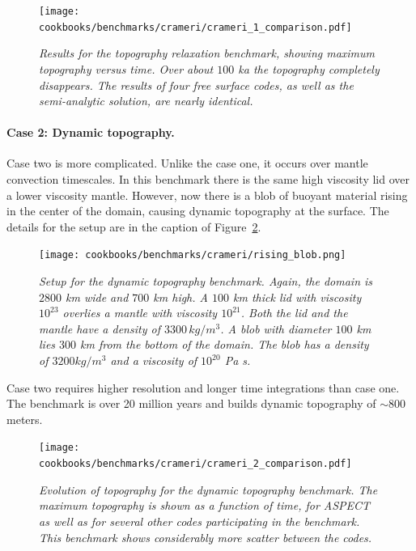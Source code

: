 \documentclass{article}
\newcommand{\aspect}{\textsc{ASPECT}}
\begin{document}
\begin{figure}
  \begin{center}
    \texttt{[image: cookbooks/benchmarks/crameri/crameri\_1\_comparison.pdf]}
  \end{center}
  \caption{\it Results for the topography relaxation benchmark, showing maximum topography 
   versus time. Over about $100$ ka the topography completely disappears. The results of four 
   free surface codes, as well as the semi-analytic solution, are nearly identical.}
  \label{fig:crameri-benchmark-relaxation-topography}
\end{figure}

\paragraph{Case 2: Dynamic topography.}
\label{sec:benchmark-crameri-case-2}

Case two is more complicated. Unlike the case one, it occurs over mantle convection 
timescales.  In this benchmark there is the same high viscosity lid over a lower 
viscosity mantle. However, now there is a blob of buoyant material rising in the 
center of the domain, causing dynamic topography at the surface. The details for the setup
are in the caption of Figure~\ref{fig:crameri-benchmark-rising-blob}.

\begin{figure}
  \begin{center}
    \texttt{[image: cookbooks/benchmarks/crameri/rising\_blob.png]}
  \end{center}
  \caption{\it Setup for the dynamic topography benchmark. Again, the domain is $2800$ km 
  wide and $700$ km high.  A $100$ km thick lid with viscosity $10^{23}$ overlies a mantle
  with viscosity $10^{21}$.  Both the lid and the mantle have a density of $3300\,kg/m^3$.
  A blob with diameter $100$ km lies $300$ km from the bottom of the domain.  The blob has 
  a density of $3200 kg/m^3$ and a viscosity of $10^{20}$ Pa s.}
  \label{fig:crameri-benchmark-rising-blob}
\end{figure}

Case two requires higher resolution and longer time integrations than case one. The benchmark
is over 20 million years and builds dynamic topography of $\sim 800$ meters.  

\begin{figure}
  \begin{center}
    \texttt{[image: cookbooks/benchmarks/crameri/crameri\_2\_comparison.pdf]}
  \end{center}
  \caption{\it Evolution of topography for the dynamic topography benchmark. The maximum topography
   is shown as a function of time, for \aspect{} as well as for several other codes participating in
   the benchmark. This benchmark shows considerably more scatter between the codes.}
  \label{fig:crameri-2-comparison}
\end{figure}
\end{document}

